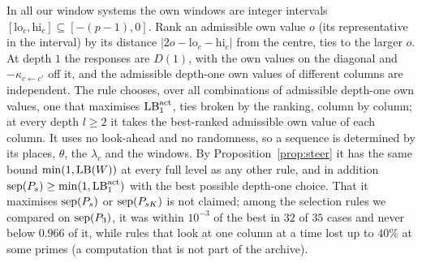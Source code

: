 \begin{remark}\label{rem:steerrule}
In all our window systems the own windows are integer intervals $[\mathrm{lo}_c,\mathrm{hi}_c]\subseteq[-(p-1),0]$. Rank an admissible own value $o$ (its representative in the interval) by its distance $|2o-\mathrm{lo}_c-\mathrm{hi}_c|$ from the centre, ties to the larger $o$. At depth $1$ the responses are $D(1)$, with the own values on the diagonal and $-\kappa_{c\leftarrow c'}$ off it, and the admissible depth-one own values of different columns are independent. The rule chooses, over all combinations of admissible depth-one own values, one that maximises $\mathrm{LB}^{\mathrm{act}}_1$, ties broken by the ranking, column by column; at every depth $l\ge2$ it takes the best-ranked admissible own value of each column. It uses no look-ahead and no randomness, so a sequence is determined by its places, $\theta$, the $\lambda_c$ and the windows. By Proposition~\ref{prop:steer} it has the same bound $\min(1,\mathrm{LB}(W))$ at every full level as any other rule, and in addition $\operatorname{sep}(P_s)\ge\min(1,\mathrm{LB}^{\mathrm{act}}_1)$ with the best possible depth-one choice. That it maximises $\operatorname{sep}(P_s)$ or $\operatorname{sep}(P_{sK})$ is not claimed; among the selection rules we compared on $\operatorname{sep}(P_3)$, it was within $10^{-3}$ of the best in $32$ of $35$ cases and never below $0.966$ of it, while rules that look at one column at a time lost up to $40\%$ at some primes (a computation that is not part of the archive).
\end{remark}
